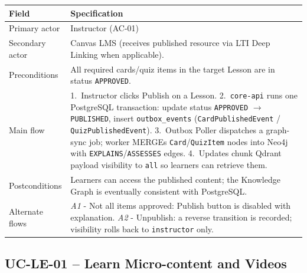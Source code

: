 \begin{longtable}{|p{3.2cm}|p{10.3cm}|}
\hline
\textbf{Field} & \textbf{Specification} \\
\hline
\endhead
Primary actor & Instructor (AC-01) \\
\hline
Secondary actor & Canvas LMS (receives published resource via LTI Deep
    Linking when applicable). \\
\hline
Preconditions & All required cards/quiz items in the target Lesson are
    in status \texttt{APPROVED}. \\
\hline
Main flow &
    1.\ Instructor clicks Publish on a Lesson.
    2.\ \texttt{core-api} runs one PostgreSQL transaction:
    update status \texttt{APPROVED} $\to$ \texttt{PUBLISHED}, insert
    \texttt{outbox\_events} (\texttt{CardPublishedEvent} /
    \texttt{QuizPublishedEvent}).
    3.\ Outbox Poller dispatches a graph-sync job; worker MERGEs
    \texttt{Card}/\texttt{QuizItem} nodes into Neo4j with
    \texttt{EXPLAINS}/\texttt{ASSESSES} edges.
    4.\ Updates chunk Qdrant payload visibility to
    \texttt{all} so learners can retrieve them. \\
\hline
Postconditions & Learners can access the published content; the
    Knowledge Graph is eventually consistent with PostgreSQL. \\
\hline
Alternate flows &
    \emph{A1} - Not all items approved: Publish button is disabled
    with explanation.
    \emph{A2} - Unpublish: a reverse transition is recorded; visibility
    rolls back to \texttt{instructor} only. \\
\hline
\end{longtable}

\subsection*{UC-LE-01 -- Learn Micro-content and Videos}

